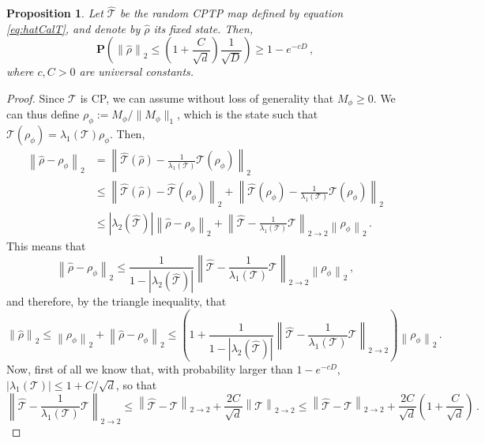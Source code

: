 \documentclass{amsart}
\newtheorem{proposition}[theorem]{Proposition}
\renewcommand{\P}{\mathbf{P}}
\renewcommand{\leq}{\leqslant}
\renewcommand{\geq}{\geqslant}
\begin{document}
\begin{proposition} \label{prop:hatrho}
    Let $\hat{\mathcal{T}}$ be the random CPTP map defined by equation \eqref{eq:hatCalT}, and denote by $\hat{\rho}$ its fixed state. %
    Then,
    \[ \P\left( \left\|\hat{\rho}\right\|_{2} \leq \left( 1+\frac{C}{\sqrt{d}} \right) \frac{1}{\sqrt{D}} \right) \geq 1-e^{-cD} \, , \]
    where $c,C>0$ are universal constants.
\end{proposition}

\begin{proof}
    Since $\mathcal{T}$ is CP, we can assume without loss of generality that $M_{\phi}\geq 0$. We can thus define $\rho_{\phi}:=M_{\phi}/\|M_{\phi}\|_1$, which is the state such that $\mathcal{T}(\rho_{\phi})=\lambda_1(\mathcal{T})\rho_{\phi}$. Then,
    \begin{align*}
        \left\|\hat{\rho}-\rho_{\phi}\right\|_2 & = \left\|\hat{\mathcal{T}}(\hat{\rho})-\frac{1}{\lambda_1(\mathcal{T})}\mathcal{T}(\rho_{\phi})\right\|_2                                                                                                     \\
                                                & \leq \left\|\hat{\mathcal{T}}(\hat{\rho})-\hat{\mathcal{T}}(\rho_{\phi})\right\|_2 + \left\|\hat{\mathcal{T}}(\rho_{\phi})-\frac{1}{\lambda_1(\mathcal{T})}\mathcal{T}(\rho_{\phi})\right\|_2                 \\
                                                & \leq |\lambda_2(\hat{\mathcal{T}})| \left\|\hat{\rho}-\rho_{\phi}\right\|_2 + \left\|\hat{\mathcal{T}}-\frac{1}{\lambda_1(\mathcal{T})}\mathcal{T}\right\|_{2\rightarrow 2} \left\|\rho_{\phi}\right\|_2 \, .
    \end{align*}
    This means that
    \[ \left\|\hat{\rho}-\rho_{\phi}\right\|_2 \leq \frac{1}{1-|\lambda_2(\hat{\mathcal{T}})|} \left\|\hat{\mathcal{T}}-\frac{1}{\lambda_1(\mathcal{T})}\mathcal{T}\right\|_{2\rightarrow 2} \left\|\rho_{\phi}\right\|_2 \, , \]
    and therefore, by the triangle inequality, that
    \[ \left\|\hat{\rho}\right\|_{2} \leq \left\|\rho_{\phi}\right\|_2 + \left\|\hat{\rho}-\rho_{\phi}\right\|_2 \leq \left( 1 + \frac{1}{1-|\lambda_2(\hat{\mathcal{T}})|} \left\|\hat{\mathcal{T}}-\frac{1}{\lambda_1(\mathcal{T})}\mathcal{T}\right\|_{2\rightarrow 2} \right) \left\|\rho_{\phi}\right\|_2 \, . \]
    Now, first of all we know that, with probability larger than $1-e^{-cD}$, $|\lambda_1(\mathcal{T})|\leq 1+C/\sqrt{d}$, so that
    \[ \left\|\hat{\mathcal{T}}-\frac{1}{\lambda_1(\mathcal{T})}\mathcal{T}\right\|_{2\rightarrow 2} \leq \left\|\hat{\mathcal{T}}-\mathcal{T}\right\|_{2\rightarrow 2} + \frac{2C}{\sqrt{d}}\left\|\mathcal{T}\right\|_{2\rightarrow 2} \leq \left\|\hat{\mathcal{T}}-\mathcal{T}\right\|_{2\rightarrow 2} + \frac{2C}{\sqrt{d}}\left(1+\frac{C}{\sqrt{d}}\right) \, .  \]

\end{proof}
\end{document}
